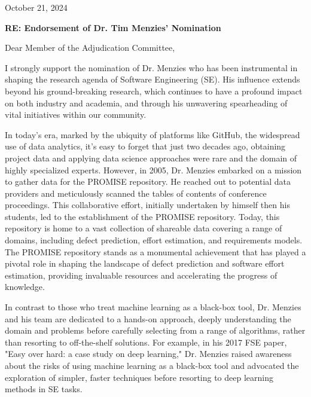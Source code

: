 \documentclass[10pt]{article}
\begin{document}
{ 
~\\~\\~\\~\\~\\
October 21, 2024

 

{\bf RE: Endorsement of Dr. Tim Menzies’ Nomination}

 

Dear Member of the Adjudication Committee,
 
 





I strongly support the nomination of Dr. Menzies who has been
instrumental in shaping the research agenda of Software Engineering
(SE). His influence extends beyond his ground-breaking research,
which continues to have a profound impact on both industry and
academia, and through his unwavering spearheading of vital initiatives
within our community.



In today's era, marked by the ubiquity of platforms like GitHub,
the widespread use of data analytics, it's easy to forget that just
two decades ago, obtaining project data and applying data science
approaches were rare and the domain of highly specialized experts.
However, in 2005, Dr. Menzies embarked on a mission to gather data
for the PROMISE repository. He reached out to potential data providers
and meticulously scanned the tables of contents of conference
proceedings. This collaborative effort, initially undertaken by
himself then his students, led to the establishment of the PROMISE
repository. Today, this repository is home to a vast collection of
shareable data covering a range of domains, including defect
prediction, effort estimation, and requirements models. The PROMISE
repository stands as a monumental achievement that has played a
pivotal role in shaping the landscape of defect prediction and
software effort estimation, providing invaluable resources and
accelerating the progress of knowledge.



In contrast to those who treat machine learning as a black-box tool,
Dr. Menzies and his team are dedicated to a hands-on approach,
deeply understanding the domain and problems before carefully
selecting from a range of algorithms, rather than resorting to
off-the-shelf solutions.  For example, in his 2017 FSE paper, "Easy
over hard: a case study on deep learning," Dr. Menzies raised
awareness about the risks of using machine learning as a black-box
tool and advocated the exploration of simpler, faster techniques
before resorting to deep learning methods in SE tasks.



}
\end{document}
